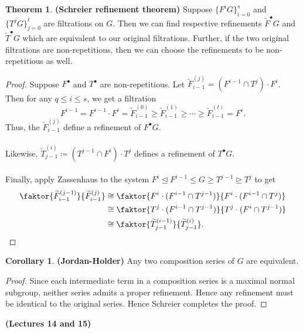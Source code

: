 \documentclass[10pt,letterpaper,cm]{nupset}
\theoremstyle{definition}
\newtheorem{theorem}{Theorem}
\newtheorem{corollary}{Corollary}
\newcommand{\1}{\mathbf{1}}
\newcommand{\0}{\vec 0}
\begin{document}
\begin{theorem}{\textbf{(Schreier refinement theorem)}}
Suppose $\{F^iG\}_{i=0}^s$ and $\{T^jG\}_{j=0}^t$ are filtrations on $G$. Then we can find respective refinements $\widetilde{F}^{\bullet}G$ and $\widetilde{T}^{\bullet}G$ which are equivalent to our original filtrations. Further, if the two original filtrations are non-repetitious, then we can choose the refinements to be non-repetitious as well. 
\end{theorem}
\begin{proof}
Suppose $F^{\bullet}$ and $T^{\bullet}$ are non-repetitious. Let $\widetilde{F}_{i-1}^{(j)} =  (F^{i-1}\cap T^j) \cdot F^i$. Then for any $q\leq i \leq s$, we get a filtration $$F^{i-1} = F^{i-1}\cdot F^i =\widetilde{F}_{i-1}^{(0)}\geq \widetilde{F}_{i-1}^{(1)}\geq \cdots \geq \widetilde{F}_{i-1}^{(t)} = F^i.$$ Thus, the $\widetilde{F}_{i-1}^{(j)}$ define a refinement of $F^{\bullet}G$. 
\\ \\ Likewise, $\widetilde{T}_{j-1}^{(i)} \coloneqq  (T^{j-1}\cap F^i) \cdot T^j$ defines a refinement of $T^{\bullet}G$.
\\ \\ Finally, apply Zassenhaus to the system $F^i \unlhd F^{i-1} \leq G \geq T^{j-1} \unrhd T^j$ to get
\begin{align*}
\faktor{\widetilde{F}_{i-1}^{(j-1)}}{\widetilde{F}_{i-1}^{(j)}} & \cong \faktor{F^i\cdot (F^{i-1} \cap T^{j-1})}{F^i \cdot (F^{i-1} \cap T^j)}
\\ &  \cong \faktor{T^j \cdot (F^{i-1} \cap T^{j-1})}{T^j\cdot (F^i \cap T^{j-1})}
\\ &  \cong   \faktor{\widetilde{T}_{j-1}^{(i-1)}}{\widetilde{T}_{j-1}^{(i)}} .
\end{align*}
\end{proof}

\begin{corollary}{\textbf{(Jordan-Holder)}}
Any two composition series of $G$ are equivalent.
\end{corollary}
\begin{proof}
Since each intermediate term in a composition series is a maximal normal subgroup, neither series admits a proper refinement. Hence any refinement must be identical to the original series. Hence Schreier completes the proof.
\end{proof}

\begin{center}
{\textbf{(Lectures 14 and 15)}}
\end{center}
\end{document}

